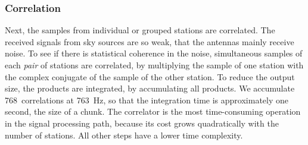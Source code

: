 \documentclass{sig-alternate}
\begin{document}



\subsubsection{Correlation}

Next, the samples from individual or grouped stations
are correlated.
The received signals from sky sources are so weak, that the antennas mainly
receive noise.
To see if there is statistical coherence in the noise, simultaneous samples of
each \emph{pair\/} of stations are correlated, by multiplying the sample of one
station with the complex conjugate of the sample of the other station.
To reduce the output size, the products are integrated, by accumulating all
products.
We accumulate 768~correlations at 763~Hz, so that the integration time is
approximately one second, the size of a chunk.
The correlator is the most time-consuming operation in the signal
processing path, because its cost grows quadratically with the number of stations.
All other steps have a lower time complexity.

\end{document}
